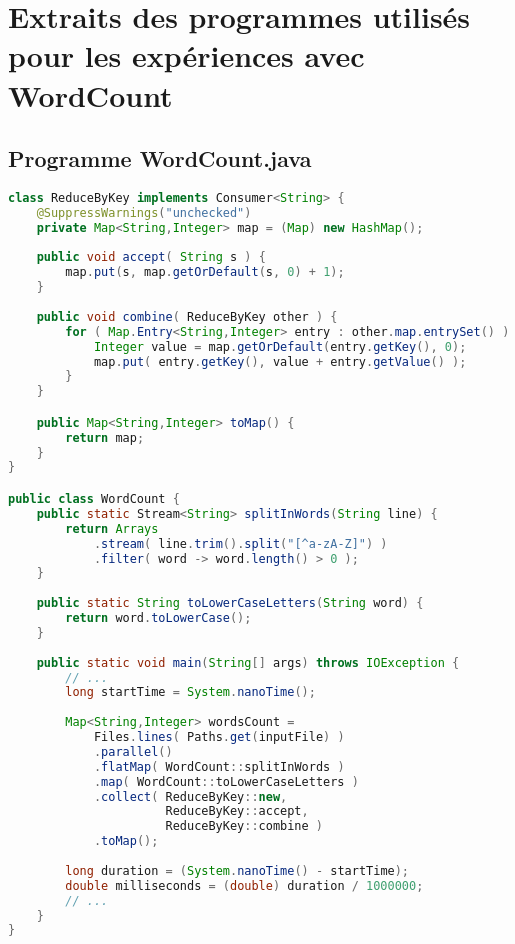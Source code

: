 \chapter{Extraits des programmes utilisés pour les expériences avec {WordCount}}
\label{appendice-code-wordcount.ann}

\section{Programme {WordCount.java}}

\begin{lstlisting}[basicstyle=\ttfamily\footnotesize,language=java]
class ReduceByKey implements Consumer<String> {
    @SuppressWarnings("unchecked")
    private Map<String,Integer> map = (Map) new HashMap();
    
    public void accept( String s ) {
        map.put(s, map.getOrDefault(s, 0) + 1);
    }
    
    public void combine( ReduceByKey other ) {
        for ( Map.Entry<String,Integer> entry : other.map.entrySet() ) {
            Integer value = map.getOrDefault(entry.getKey(), 0);
            map.put( entry.getKey(), value + entry.getValue() );
        } 
    }

    public Map<String,Integer> toMap() {
        return map;
    }
}

public class WordCount {
    public static Stream<String> splitInWords(String line) {
        return Arrays
            .stream( line.trim().split("[^a-zA-Z]") )
            .filter( word -> word.length() > 0 );
    }
    
    public static String toLowerCaseLetters(String word) {
        return word.toLowerCase();
    }
    
    public static void main(String[] args) throws IOException {
        // ...
        long startTime = System.nanoTime();
        
        Map<String,Integer> wordsCount = 
            Files.lines( Paths.get(inputFile) )
            .parallel()
            .flatMap( WordCount::splitInWords )
            .map( WordCount::toLowerCaseLetters )
            .collect( ReduceByKey::new,
                      ReduceByKey::accept,
                      ReduceByKey::combine )
            .toMap();
        
        long duration = (System.nanoTime() - startTime);
        double milliseconds = (double) duration / 1000000;
        // ...
    }
}        
\end{lstlisting}


